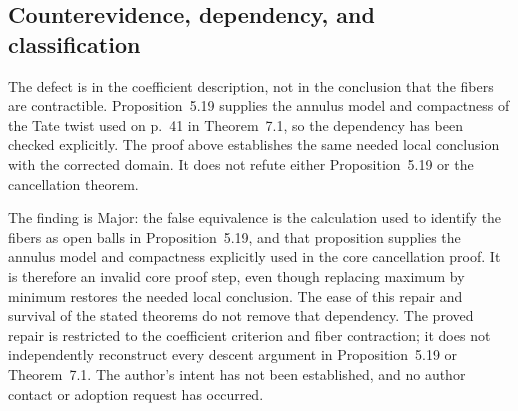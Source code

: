 \documentclass[10pt]{article}
\begin{document}
\subsection*{Counterevidence, dependency, and classification}
The defect is in the coefficient description, not in the conclusion that the fibers are contractible. Proposition 5.19 supplies the annulus model and compactness of the Tate twist used on p. 41 in Theorem 7.1, so the dependency has been checked explicitly. The proof above establishes the same needed local conclusion with the corrected domain. It does not refute either Proposition 5.19 or the cancellation theorem.\par
The finding is Major: the false equivalence is the calculation used to identify the fibers as open balls in Proposition 5.19, and that proposition supplies the annulus model and compactness explicitly used in the core cancellation proof. It is therefore an invalid core proof step, even though replacing maximum by minimum restores the needed local conclusion. The ease of this repair and survival of the stated theorems do not remove that dependency. The proved repair is restricted to the coefficient criterion and fiber contraction; it does not independently reconstruct every descent argument in Proposition 5.19 or Theorem 7.1. The author’s intent has not been established, and no author contact or adoption request has occurred.\par
\end{document}
